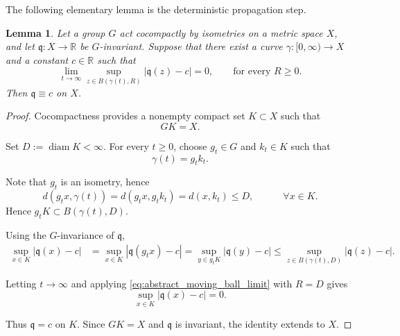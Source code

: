 \documentclass[11pt]{amsart}
\theoremstyle{plain}
\newtheorem{lemma}[theorem]{Lemma}
\theoremstyle{plain}
\theoremstyle{plain}
\newcommand{\R}{\mathbb R}
\numberwithin{equation}{section}
\begin{document}
The following elementary lemma is the deterministic propagation step.

\begin{lemma}\label{lem:cocompact_propagation}
Let a group \(G\) act cocompactly by isometries on a metric space \(X\),
and let $\mathfrak{q}:X\longrightarrow\R$ be \(G\)-invariant.  Suppose that there exist a curve
\(\gamma: [0,\infty)\rightarrow X\) and a constant \(c\in\R\) such that 
\begin{equation}\label{eq:abstract_moving_ball_limit}
\lim_{t\to\infty}
\sup_{z\in B(\gamma(t),R)}|\mathfrak{q}(z)-c|=0, \quad \quad \text{for every }R\geq0.
\end{equation}
Then $\mathfrak{q}\equiv c$ on $X$.
\end{lemma}

\begin{proof}
Cocompactness provides a nonempty compact set \(K\subset X\) such that
\[
GK=X.
\]

Set $D:=\operatorname{diam}K<\infty$.  For every \(t\geq 0\), choose \(g_t\in G\) and \(k_t\in K\) such that
\[
\gamma(t)=g_tk_t.
\]

Note that $g_t$ is an isometry, hence
\[
d(g_tx,\gamma(t))
=
d(g_tx,g_tk_t)
=
d(x,k_t)
\leq D, \quad \quad \quad \forall x\in K.
\]
Hence $g_tK\subset B(\gamma(t),D)$.

Using the \(G\)-invariance of \(\mathfrak{q}\),
\begin{align*}
\sup_{x\in K}|\mathfrak{q}(x)-c|&=\sup_{x\in K}|\mathfrak{q}(g_tx)-c|=
\sup_{y\in g_tK}|\mathfrak{q}(y)-c|\leq
\sup_{z\in B(\gamma(t),D)}|\mathfrak{q}(z)-c|.
\end{align*}

Letting \(t\to\infty\) and applying
\eqref{eq:abstract_moving_ball_limit} with \(R=D\) gives
\[
\sup_{x\in K}|\mathfrak{q}(x)-c|=0.
\]

Thus \(\mathfrak{q}=c\) on \(K\).  Since \(GK=X\) and \(\mathfrak{q}\) is invariant, the identity extends to \(X\).
\end{proof}
\end{document}
